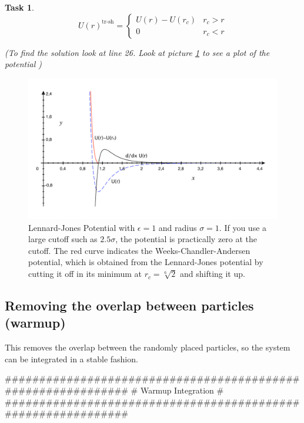 \documentclass[
paper=a4,                       %
fontsize=11pt,                  %
twoside,                        %
footsepline,                    %
headsepline,                    %
headinclude=false,              %
footinclude=false,              %
pagesize,                       %
]{scrartcl}
\newtheorem{task}{Task}
\begin{document}
{{\begin{minipage}{0.95\textwidth}
\begin{task}
     \[ U(r)^{\text{tr-sh}}  =\left\{ \begin{array}{ll}  U(r)-U(r_{c})  &  r_{c} > r \\
     
     0 &   r_{c}  < r \end{array} \right. \]
     
  (To find the solution look at line 26. Look at picture \ref{pic:lennard-jones} to see a plot of the potential )

   \end{task}

\end{minipage}}\vspace{1cm}

\begin{figure}[ht]
\begin{center}
\includegraphics[width=12cm]{figures/lennard-jones-potential.pdf}
\caption[long text]{Lennard-Jones Potential with
  $\epsilon=1$ and radius $\sigma=1$. If you use a large cutoff such as
  $2.5\sigma$, the potential is practically zero at the cutoff. The
  red curve indicates the Weeks-Chandler-Andersen potential, which
  is obtained from the Lennard-Jones potential by cutting it off in
  its minimum at $r_c=\sqrt[6]{2}$ and shifting it up.}
\label{pic:lennard-jones}
\end{center}
\end{figure}


\subsection{Removing the overlap between particles (warmup)}

This removes the overlap between the randomly placed particles, so the system can be integrated in a stable fashion.
\begin{pypresso}
#############################################################
#  Warmup Integration                                       #
#############################################################


\end{pypresso}}
\end{document}

